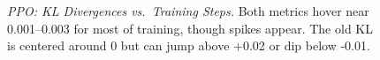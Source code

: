 \begin{figure} 
	\centering
	\quad
	\caption{\emph{PPO: KL Divergences vs.\ Training Steps.}
		Both metrics hover near 0.001--0.003 for most of training, 
		though spikes appear. The old KL is centered around 0 but can jump above +0.02 or dip below -0.01.}
	\label{fig:ppo_bothkl}
\end{figure}

